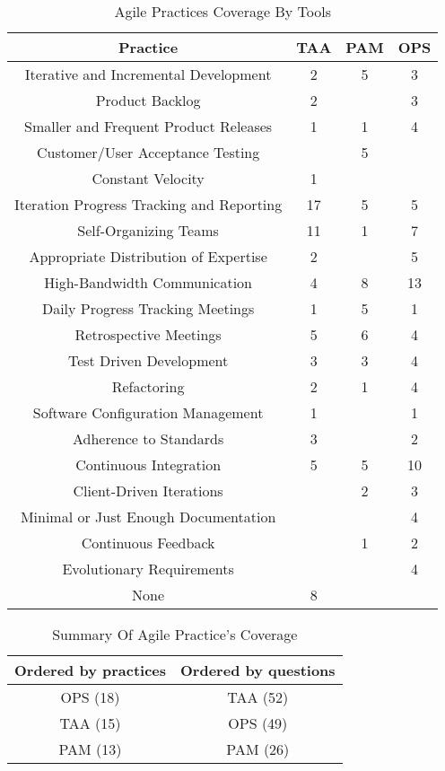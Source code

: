 \begin{table}
	\begin{tabular}{| c | c | c | c |} \hline
		\textbf{Practice} & \textbf{TAA} & \textbf{PAM} & \textbf{OPS} \\ \hline
		Iterative and Incremental Development & 2 & 5 & 3 \\ \hline
		Product Backlog \CrossMaltese & 2 & & 3 \\ \hline
		Smaller and Frequent Product Releases \CrossMaltese & 1 & 1 & 4 \\ \hline
		Customer/User Acceptance Testing & & 5 & \\ \hline
		Constant Velocity \CrossMaltese & 1 & & \\ \hline
		Iteration Progress Tracking and Reporting \CrossMaltese & 17 & 5 & 5 \\ \hline
		Self-Organizing Teams \CrossMaltese & 11 & 1 & 7 \\ \hline
		Appropriate Distribution of Expertise & 2 & & 5 \\ \hline
		High-Bandwidth Communication & 4 & 8 & 13 \\ \hline
		Daily Progress Tracking Meetings \CrossMaltese & 1 & 5 & 1 \\ \hline
		Retrospective Meetings \CrossMaltese & 5 & 6 & 4 \\ \hline
		Test Driven Development \CrossMaltese & 3 & 3 & 4 \\ \hline
		Refactoring \CrossMaltese & 2 & 1 & 4 \\ \hline
		Software Configuration Management \CrossMaltese & 1 & & 1 \\ \hline
		Adherence to Standards \CrossMaltese & 3 & & 2 \\ \hline
		Continuous Integration \CrossMaltese & 5 & 5 & 10 \\ \hline
		Client-Driven Iterations & & 2 & 3 \\ \hline
		Minimal or Just Enough Documentation & & & 4 \\ \hline
		Continuous Feedback & & 1 & 2 \\ \hline
		Evolutionary Requirements \CrossMaltese & & & 4 \\ \hline
	 	None & 8 & & \\ \hline
	\end{tabular}
	\caption{Agile Practices Coverage By Tools}
	\label{table:agile_practices_coverage}
\end{table}

\begin{table}
	\begin{tabular}{| c | c |} \hline
		\textbf{Ordered by practices} & \textbf{Ordered by questions} \\ \hline
		OPS (18) & TAA (52) \\ \hline
		TAA (15) & OPS (49) \\ \hline
		PAM (13) & PAM (26) \\ \hline
	\end{tabular}
	\caption{Summary Of Agile Practice's Coverage}
	\label{table:agile_practices_coverage_summary}
\end{table}

